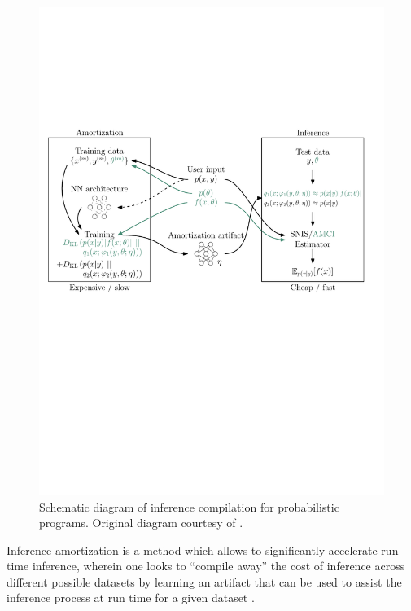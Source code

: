 \documentclass[12pt]{article}
\begin{document}
\begin{figure}[t]
  \centering
  \includegraphics[width=\linewidth]{figures/diagram.pdf}
  \caption{
  Schematic diagram of inference compilation for probabilistic programs. 
  Original diagram courtesy of \citet{LeEtAl2016}.}
  \label{fig:inf-amortization}
\end{figure}

Inference amortization is a method which allows to significantly accelerate run-time inference, wherein one looks to ``compile away'' the cost of inference
across different possible datasets
by learning an artifact that can be used to assist the inference process
at run time for a given dataset
\citep{StuhlmullerEtAl2013, VAE, ritchie2016deep, PaigeWood2016, LeEtAl2016, LeEtAl2017, FIVO, NaessethEtAl2017}.
\end{document}
